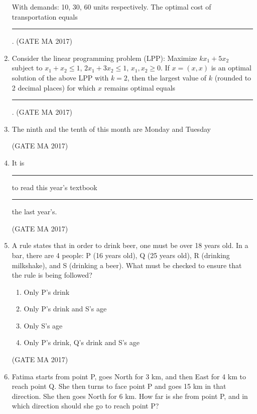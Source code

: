 \documentclass[journal,12pt,onecolumn]{IEEEtran}
\theoremstyle{remark}
\begin{document}
\begin{enumerate}
With demands: 10, 30, 60 units respectively. The optimal cost of transportation equals \\ \rule{1.5cm}{0.4pt}.
\hfill (GATE MA 2017)
\item
Consider the linear programming problem (LPP):
Maximize $k x_1 + 5x_2$ subject to $x_1 + x_2 \leq 1$, $2x_1 + 3x_2 \leq 1$, $x_1, x_2 \geq 0$. If $x = (x, x)$ is an optimal solution of the above LPP with $k = 2$, then the largest value of $k$ (rounded to 2 decimal places) for which $x$ remains optimal equals \rule{1.5cm}{0.4pt}.
\hfill (GATE MA 2017)
\item
The ninth and the tenth of this month are Monday and Tuesday
\begin{enumerate}
\end{enumerate}
\hfill (GATE MA 2017)
\item
It is \rule{1.5cm}{0.4pt} to read this year's textbook \rule{1.5cm}{0.4pt} the last year's.
\begin{enumerate}
\end{enumerate}
\hfill (GATE MA 2017)
\item
A rule states that in order to drink beer, one must be over 18 years old. In a bar, there are 4 people: P (16 years old), Q (25 years old), R (drinking milkshake), and S (drinking a beer). What must be checked to ensure that the rule is being followed?
\begin{enumerate}
\item Only P's drink
\item Only P's drink and S's age
\item Only S's age
\item Only P's drink, Q's drink and S's age
\end{enumerate}
\hfill (GATE MA 2017)
\item
Fatima starts from point P, goes North for 3 km, and then East for 4 km to reach point Q. She then turns to face point P and goes 15 km in that direction. She then goes North for 6 km. How far is she from point P, and in which direction should she go to reach point P?

\end{enumerate}
\end{document}
